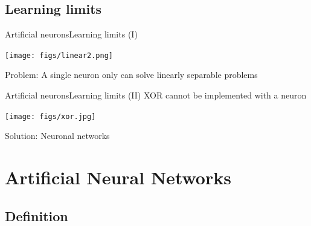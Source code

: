 \documentclass[10pt,compress]{beamer} %
\begin{document}
\subsection{Learning limits}
\begin{frame}{Artificial neurons}{Learning limits (I)}
	\begin{center}
	\texttt{[image: figs/linear2.png]}
	\end{center}
	Problem: A single neuron only can solve linearly separable problems
\end{frame}

\begin{frame}{Artificial neurons}{Learning limits (II)}
	XOR cannot be implemented with a neuron
	\begin{center}
	\texttt{[image: figs/xor.jpg]}
	\end{center}
	Solution: Neuronal networks
\end{frame}

\section{Artificial Neural Networks}
\subsection{Definition}


\end{document}
